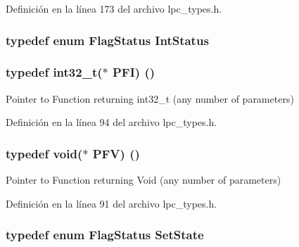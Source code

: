 Definición en la línea 173 del archivo lpc\+\_\+types.\+h.

\subsubsection[{\texorpdfstring{Int\+Status}{IntStatus}}]{\setlength{\rightskip}{0pt plus 5cm}typedef  enum {\bf Flag\+Status}  {\bf Int\+Status}}\hypertarget{group___l_p_c___types___public___types_gab7d263072f745b4f3913fb0afc434c4e}{}\label{group___l_p_c___types___public___types_gab7d263072f745b4f3913fb0afc434c4e}
\subsubsection[{\texorpdfstring{P\+FI}{PFI}}]{\setlength{\rightskip}{0pt plus 5cm}typedef int32\+\_\+t($\ast$ P\+FI) ()}\hypertarget{group___l_p_c___types___public___types_ga5cad251913e41ad7a8c765945356ec47}{}\label{group___l_p_c___types___public___types_ga5cad251913e41ad7a8c765945356ec47}
Pointer to Function returning int32\+\_\+t (any number of parameters) 

Definición en la línea 94 del archivo lpc\+\_\+types.\+h.

\subsubsection[{\texorpdfstring{P\+FV}{PFV}}]{\setlength{\rightskip}{0pt plus 5cm}typedef void($\ast$ P\+FV) ()}\hypertarget{group___l_p_c___types___public___types_ga5f7b826e88ffb1fae2260abb3a75b19a}{}\label{group___l_p_c___types___public___types_ga5f7b826e88ffb1fae2260abb3a75b19a}
Pointer to Function returning Void (any number of parameters) 

Definición en la línea 91 del archivo lpc\+\_\+types.\+h.

\subsubsection[{\texorpdfstring{Set\+State}{SetState}}]{\setlength{\rightskip}{0pt plus 5cm}typedef  enum {\bf Flag\+Status}  {\bf Set\+State}}\hypertarget{group___l_p_c___types___public___types_ga7fab312a9f10f1386a955977d2ec96fe}{}\label{group___l_p_c___types___public___types_ga7fab312a9f10f1386a955977d2ec96fe}
